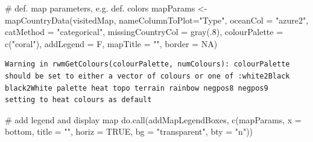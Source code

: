 \documentclass[
  letterpaper,
  DIV=11,
  numbers=noendperiod]{scrartcl}
\newenvironment{Shaded}{\begin{snugshade}}{\end{snugshade}}
\newcommand{\AttributeTok}[1]{\textcolor[rgb]{0.40,0.46,0.14}{#1}}
\newcommand{\CommentTok}[1]{\textcolor[rgb]{0.37,0.37,0.37}{#1}}
\newcommand{\ConstantTok}[1]{\textcolor[rgb]{0.56,0.35,0.01}{#1}}
\newcommand{\DecValTok}[1]{\textcolor[rgb]{0.68,0.00,0.00}{#1}}
\newcommand{\FunctionTok}[1]{\textcolor[rgb]{0.28,0.35,0.67}{#1}}
\newcommand{\NormalTok}[1]{\textcolor[rgb]{0.00,0.46,0.62}{#1}}
\newcommand{\OtherTok}[1]{\textcolor[rgb]{0.00,0.46,0.62}{#1}}
\newcommand{\StringTok}[1]{\textcolor[rgb]{0.13,0.47,0.30}{#1}}
\begin{document}
\begin{Shaded}
\begin{Highlighting}[]
\CommentTok{\# def. map parameters, e.g. def. colors}
\NormalTok{mapParams }\OtherTok{\textless{}{-}} \FunctionTok{mapCountryData}\NormalTok{(visitedMap, }
                            \AttributeTok{nameColumnToPlot=}\StringTok{"Type"}\NormalTok{,}
                            \AttributeTok{oceanCol =} \StringTok{"azure2"}\NormalTok{,}
                            \AttributeTok{catMethod =} \StringTok{"categorical"}\NormalTok{,}
                            \AttributeTok{missingCountryCol =} \FunctionTok{gray}\NormalTok{(.}\DecValTok{8}\NormalTok{),}
                            \AttributeTok{colourPalette =} \FunctionTok{c}\NormalTok{(}\StringTok{"coral"}\NormalTok{),}
                            \AttributeTok{addLegend =}\NormalTok{ F,}
                            \AttributeTok{mapTitle =} \StringTok{""}\NormalTok{,}
                            \AttributeTok{border =} \ConstantTok{NA}\NormalTok{)}
\end{Highlighting}
\end{Shaded}

\begin{verbatim}
Warning in rwmGetColours(colourPalette, numColours): colourPalette should be set to either a vector of colours or one of :white2Black black2White palette heat topo terrain rainbow negpos8 negpos9 
setting to heat colours as default
\end{verbatim}

\begin{Shaded}
\begin{Highlighting}[]
\CommentTok{\# add legend and display map}
\FunctionTok{do.call}\NormalTok{(addMapLegendBoxes, }\FunctionTok{c}\NormalTok{(mapParams,}
                             \AttributeTok{x =} \StringTok{\textquotesingle{}bottom\textquotesingle{}}\NormalTok{,}
                             \AttributeTok{title =} \StringTok{""}\NormalTok{,}
                             \AttributeTok{horiz =} \ConstantTok{TRUE}\NormalTok{,}
                             \AttributeTok{bg =} \StringTok{"transparent"}\NormalTok{,}
                             \AttributeTok{bty =} \StringTok{"n"}\NormalTok{))}
\end{Highlighting}
\end{Shaded}
\end{document}
